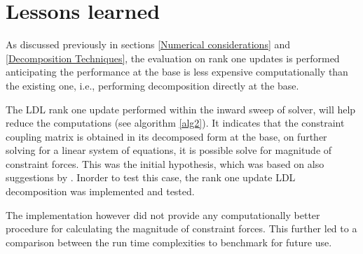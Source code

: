 \section{Lessons learned}
As discussed previously in sections \ref{Numerical considerations} and \ref{Decomposition Techniques}, the evaluation on rank one updates is performed anticipating the performance at the base is less expensive computationally than the existing one, i.e., performing decomposition directly at the base.
\par
The LDL rank one update performed within the inward sweep of solver, will help reduce the computations (see algorithm \ref{alg2}). It indicates that the constraint coupling matrix is obtained in its decomposed form at the base, on further solving for a linear system of equations, it is possible solve for magnitude of constraint forces. This was the initial hypothesis, which was based on also suggestions by \cite{shakhimardanov2015}. Inorder to test this case, the rank one update LDL decomposition was implemented and tested. 
\par
The implementation however did not provide any computationally better procedure for calculating the magnitude of constraint forces. This further led to a comparison between the run time complexities to benchmark for future use.
	
